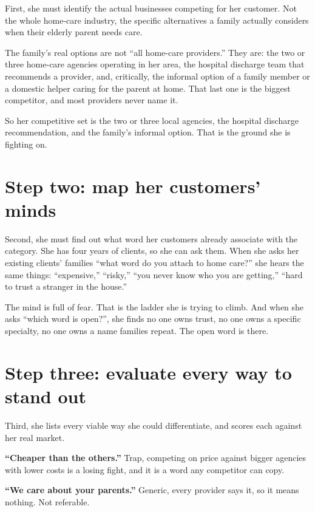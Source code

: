 \documentclass[10pt,twoside,openany]{memoir}
\newcommand{\needspacehead}{\needspace{4\baselineskip}}
\let\oldsection\section
\renewcommand{\section}{\needspacehead\oldsection}
\begin{document}
First, she must identify the actual businesses competing for her
customer. Not the whole home-care industry, the specific alternatives a
family actually considers when their elderly parent needs care.

The family's real options are not ``all home-care providers.'' They are:
the two or three home-care agencies operating in her area, the hospital
discharge team that recommends a provider, and, critically, the informal
option of a family member or a domestic helper caring for the parent at
home. That last one is the biggest competitor, and most providers never
name it.

So her competitive set is the two or three local agencies, the hospital
discharge recommendation, and the family's informal option. That is the
ground she is fighting on.

\section{Step two: map her customers'
minds}\label{step-two-map-her-customers-minds}

Second, she must find out what word her customers already associate with
the category. She has four years of clients, so she can ask them. When
she asks her existing clients' families ``what word do you attach to
home care?'' she hears the same things: ``expensive,'' ``risky,'' ``you
never know who you are getting,'' ``hard to trust a stranger in the
house.''

The mind is full of fear. That is the ladder she is trying to climb. And
when she asks ``which word is open?'', she finds no one owns trust, no
one owns a specific specialty, no one owns a name families repeat. The
open word is there.

\section{Step three: evaluate every way to stand
out}\label{step-three-evaluate-every-way-to-stand-out}

Third, she lists every viable way she could differentiate, and scores
each against her real market.

\textbf{``Cheaper than the others.''} Trap, competing on price against
bigger agencies with lower costs is a losing fight, and it is a word any
competitor can copy.

\textbf{``We care about your parents.''} Generic, every provider says
it, so it means nothing. Not referable.
\end{document}
